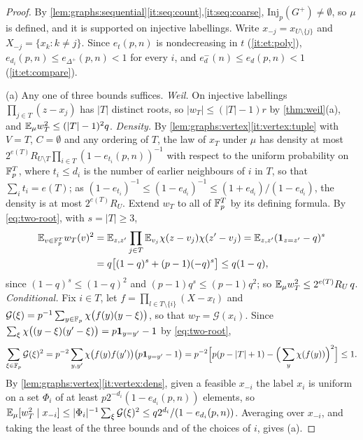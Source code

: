 \begin{proof}
By \cref{lem:graphs:sequential}\ref{it:seq:count},\ref{it:seq:coarse},
$\mathrm{Inj}_p(G^+)\ne\emptyset$, so $\mu$ is defined, and it is supported on
injective labellings. Write $x_{-j}=x_{U\setminus\{j\}}$ and
$X_{-j}=\{x_k:k\ne j\}$. Since $e_t(p,n)$ is nondecreasing in $t$
(\ref{it:et:poly}), $e_{d_i}(p,n)\le e_{\Delta^+}(p,n)<1$ for every $i$, and
$e^-_d(n)\le e_d(p,n)<1$ (\ref{it:et:compare}).

(a) Any one of three bounds suffices. \emph{Weil.} On injective labellings
$\prod_{j\in T}(z-x_j)$ has $|T|$ distinct roots, so $|w_T|\le(|T|-1)r$ by
\cref{thm:weil}(a), and $\mathbb E_\mu w_T^2\le(|T|-1)^2q$. \emph{Density.} By
\cref{lem:graphs:vertex}\ref{it:vertex:tuple} with $V=T$, $C=\emptyset$ and any
ordering of $T$, the law of $x_T$ under $\mu$ has density at most
$2^{e(T)}R_{U\setminus T}\prod_{i\in T}(1-e_{t_i}(p,n))^{-1}$ with respect to the
uniform probability on $\mathbb F_p^T$, where $t_i\le d_i$ is the number of earlier
neighbours of $i$ in $T$, so that $\sum_it_i=e(T)$; as
$(1-e_{t_i})^{-1}\le(1-e_{d_i})^{-1}\le(1+e_{d_i})/(1-e_{d_i})$, the density is at
most $2^{e(T)}R_U$. Extend $w_T$ to all of $\mathbb F_p^T$ by its defining formula. By
\eqref{eq:two-root}, with $s=|T|\ge3$,
\begin{align*}
 \mathbb E_{v\in\mathbb F_p^T}w_T(v)^2&=\mathbb E_{z,z'}\prod_{j\in T}\mathbb E_{v_j}\chi(z-v_j)\chi(z'-v_j)
 =\mathbb E_{z,z'}(\mathbf 1_{z=z'}-q)^s\\
 &=q\big[(1-q)^s+(p-1)(-q)^s\big]\le q(1-q),
\end{align*}
since $(1-q)^s\le(1-q)^2$ and $(p-1)q^s\le(p-1)q^2$; so
$\mathbb E_\mu w_T^2\le2^{e(T)}R_U\,q$. \emph{Conditional.} Fix $i\in T$, let
$f=\prod_{l\in T\setminus\{i\}}(X-x_l)$ and
$\mathcal G(\xi)=p^{-1}\sum_{y\in\mathbb F_p}\chi\big(f(y)(y-\xi)\big)$, so that
$w_T=\mathcal G(x_i)$. Since
$\sum_\xi\chi\big((y-\xi)(y'-\xi)\big)=p\mathbf 1_{y=y'}-1$ by \eqref{eq:two-root},
\[
 \sum_{\xi\in\mathbb F_p}\mathcal G(\xi)^2
 =p^{-2}\sum_{y,y'}\chi\big(f(y)f(y')\big)\big(p\mathbf 1_{y=y'}-1\big)
 =p^{-2}\Big[p(p-|T|+1)-\Big(\sum_y\chi(f(y))\Big)^2\Big]\le1 .
\]
By \cref{lem:graphs:vertex}\ref{it:vertex:dens}, given a feasible $x_{-i}$ the
label $x_i$ is uniform on a set $\Phi_i$ of at least
$p2^{-d_i}(1-e_{d_i}(p,n))$ elements, so
$\mathbb E_\mu[w_T^2\mid x_{-i}]\le|\Phi_i|^{-1}\sum_\xi\mathcal G(\xi)^2
\le q2^{d_i}/(1-e_{d_i}(p,n))$. Averaging over $x_{-i}$, and taking the least of
the three bounds and of the choices of $i$, gives (a).


\end{proof}
